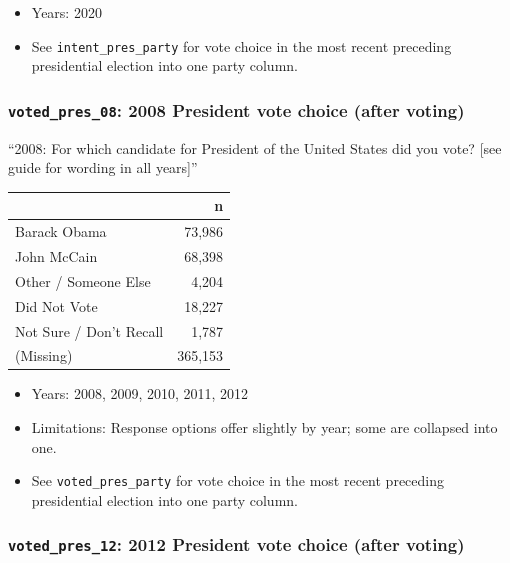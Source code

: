 \documentclass[10pt,article,oneside]{memoir}
\theoremstyle{definition}
\begin{document}
\begin{itemize}
\tightlist
\item
  Years: 2020
\item
  See \texttt{intent\_pres\_party} for vote choice in the most recent
  preceding presidential election into one party column.
\end{itemize}

\hypertarget{voted_pres_08-2008-president-vote-choice-after-voting}{%
\subsubsection{\texorpdfstring{\texttt{voted\_pres\_08}: 2008 President
vote choice (after
voting)}{voted\_pres\_08: 2008 President vote choice (after voting)}}\label{voted_pres_08-2008-president-vote-choice-after-voting}}

``2008: For which candidate for President of the United States did you
vote? {[}see guide for wording in all years{]}''

\begin{table}[H]
\centering
\begin{tabular}[t]{lr}
\toprule
 & n\\
\midrule
Barack Obama & 73,986\\
John McCain & 68,398\\
Other / Someone Else & 4,204\\
Did Not Vote & 18,227\\
Not Sure / Don't Recall & 1,787\\
(Missing) & 365,153\\
\bottomrule
\end{tabular}
\end{table}

\begin{itemize}
\tightlist
\item
  Years: 2008, 2009, 2010, 2011, 2012
\item
  Limitations: Response options offer slightly by year; some are
  collapsed into one.
\item
  See \texttt{voted\_pres\_party} for vote choice in the most recent
  preceding presidential election into one party column.
\end{itemize}

\hypertarget{voted_pres_12-2012-president-vote-choice-after-voting}{%
\subsubsection{\texorpdfstring{\texttt{voted\_pres\_12}: 2012 President
vote choice (after
voting)}{voted\_pres\_12: 2012 President vote choice (after voting)}}\label{voted_pres_12-2012-president-vote-choice-after-voting}}
\end{document}
